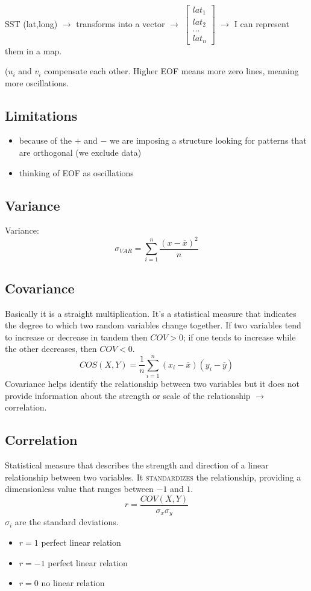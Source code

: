 SST (lat,long) $\rightarrow$ transforms into a vector $\rightarrow$ $\begin{bmatrix}
		lat_1 \\
		lat_2 \\
		...   \\
		lat_n
	\end{bmatrix}$ $\rightarrow$ I can represent them in a map.

($u_i$ and $v_i$ compensate each other. Higher EOF means more zero lines, meaning more oscillations.
\subsection{Limitations}
\begin{itemize}
	\item because of the $+$ and $-$ we are imposing a structure looking for patterns that are orthogonal (we exclude data)
	\item thinking of EOF as oscillations
\end{itemize}
\subsection{Variance}
Variance:
\begin{equation}
	\sigma_{VAR}=\displaystyle\sum_{i=1}^n\frac{(x-\overline{x})^2}{n}
\end{equation}
\subsection{Covariance}
Basically it is a straight multiplication. It's a statistical measure that indicates the degree to which two random variables change together. If two variables tend to increase or decrease in tandem then $COV>0$; if one tends to increase while the other decreases, then $COV<0$.
\begin{equation}
	COS(X,Y)=\frac{1}{n}\sum_{i=1}^n(x_i-\overline{x})(y_i-\overline{y})
\end{equation}
Covariance helps identify the relationship between two variables but it does not provide information about the strength or scale of the relationship $\rightarrow$ correlation.
\subsection{Correlation}
Statistical measure that describes the strength and direction of a linear relationship between two variables. It \textsc{standardizes} the relationship, providing a dimensionless value that ranges between $-1$ and $1$.
\begin{equation}
	r=\frac{COV(X,Y)}{\sigma_x\sigma_y}
\end{equation}
$\sigma_i$ are the standard deviations.
\begin{itemize}
	\item $r=1$ perfect  linear relation
	\item $r=-1$  perfect  linear relation
	\item $r=0$ no linear relation
\end{itemize}

